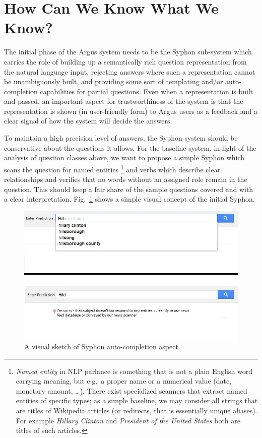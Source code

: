 \documentclass[11pt,a4paper]{article}
\begin{document}
\section{How Can We Know What We Know?}
\label{syphon}

The initial phase of the Argus system needs to be the Syphon sub-system
which carries the role of building up a semantically rich question
representation from the natural language input, rejecting answers where
such a representation cannot be unambiguously built, and providing
some sort of templating and/or auto-completion capabilities for partial
questions.  Even when a representation is built and passed, an important
aspect for trustworthiness of the system is that the representation is
shown (in user-friendly form) to Argus users as a feedback and a clear
signal of how the system will decide the answers.

To maintain a high precision level of answers, the Syphon system should be
conservative about the questions it allows.  For the baseline system,
in light of the analysis of question classes above,
we want to propose a simple Syphon which scans the question
for named entities%
\footnote{\textit{Named entity} in NLP parlance is something that is
	not a plain English word carrying meaning, but e.g.\ a proper
	name or a numerical value (date, monetary amount, \dots).
	There exist specialized scanners that extract named entities
	of specific types; as a simple baseline, we may consider
	all strings that are titles of Wikipedia articles (or redirects,
	that is essentially unique aliases).  For example
	\textit{Hillary Clinton} and \textit{President of the United States}
	both are titles of such articles.}
and verbs which describe clear relationships
and verifies that no words without an assigned role remain
in the question.  This should keep a fair share of the sample questions
covered and with a clear interpretation.
Fig.~\ref{fig:syphon} shows a simple visual concept of the initial Syphon.

\begin{figure}[ht]
	\centering
	\includegraphics[width=14cm]{syphon_ss.jpg}
	\caption{A visual sketch of Syphon auto-completion aspect.}
	\label{fig:syphon}
\end{figure}
\end{document}
